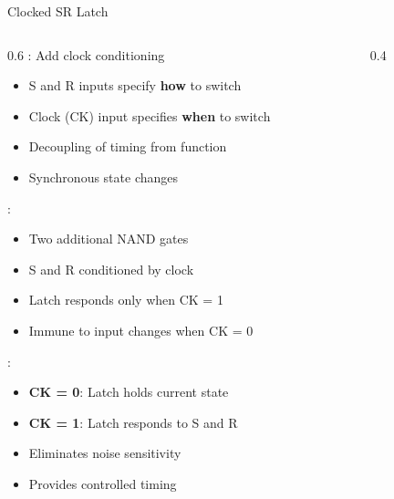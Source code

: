 \begin{frame}{Clocked SR Latch}
\begin{columns}
\begin{column}{0.6\textwidth}
: Add clock conditioning
\begin{itemize}
\item S and R inputs specify \textbf{how} to switch
\item Clock (CK) input specifies \textbf{when} to switch
\item Decoupling of timing from function
\item Synchronous state changes
\end{itemize}
\vspace{0.3cm}
:
\begin{itemize}
\item Two additional NAND gates
\item S and R conditioned by clock
\item Latch responds only when CK = 1
\item Immune to input changes when CK = 0
\end{itemize}
\vspace{0.3cm}
:
\begin{itemize}
\item \textbf{CK = 0}: Latch holds current state
\item \textbf{CK = 1}: Latch responds to S and R
\item Eliminates noise sensitivity
\item Provides controlled timing
\end{itemize}
\end{column}
\begin{column}{0.4\textwidth}
\begin{center}

\end{center}
\end{column}
\end{columns}
\end{frame}
